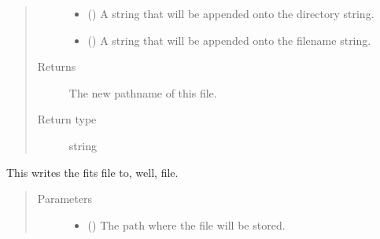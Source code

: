 \documentclass[letterpaper,10pt,english]{sphinxmanual}
\begin{document}
\begin{fulllineitems}
\begin{fulllineitems}
\begin{quote}
\begin{description}
\begin{itemize}
\item {} 
 (\sphinxstyleliteralemphasis{\sphinxupquote{ (}}\sphinxstyleliteralemphasis{\sphinxupquote{)}}) \textendash{} A string that will be appended onto the directory string.

\item {} 
 (\sphinxstyleliteralemphasis{\sphinxupquote{ (}}\sphinxstyleliteralemphasis{\sphinxupquote{)}}) \textendash{} A string that will be appended onto the filename string.

\end{itemize}

\item[{Returns}] \leavevmode
{} \textendash{} The new pathname of this file.

\item[{Return type}] \leavevmode
string

\end{description}\end{quote}

\end{fulllineitems}


\begin{fulllineitems}
\label{\detokenize{python_docstrings/IfA_Smeargle.zulu.zulu_main:IfA_Smeargle.zulu.zulu_main.IfasDataArray.write_fits_file}}
This writes the fits file to, well, file.
\begin{quote}\begin{description}
\item[{Parameters}] \leavevmode\begin{itemize}
\item {} 
 (\sphinxstyleliteralemphasis{\sphinxupquote{ (}}\sphinxstyleliteralemphasis{\sphinxupquote{)}}) \textendash{} The path where the file will be stored.


\end{itemize}
\end{description}
\end{quote}
\end{fulllineitems}
\end{fulllineitems}
\end{document}
